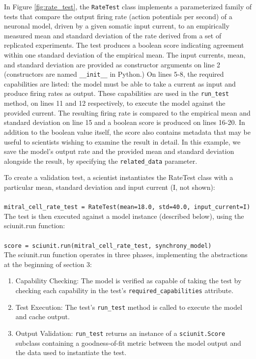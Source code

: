 \documentclass[11pt,letterpaper]{article}
\begin{document}
In Figure \ref{fig:rate_test}, the \verb|RateTest| class implements a parameterized family of tests that compare the output firing rate (action potentials per second) of a neuronal model, driven by a given somatic input current, to an empirically measured mean and standard deviation of the rate derived from a set of replicated experiments. The test produces a boolean score indicating agreement within one standard deviation of the empirical mean. The input currents, mean, and standard deviation are provided as constructor arguments on line 2 (constructors are named \verb|__init__| in Python.) On lines 5-8, the required capabilities are listed: the model must be able to take a current as input and produce firing rates as output. These capabilities are used in the \verb|run_test| method, on lines 11 and 12 respectively, to execute the model against the provided current. The resulting firing rate is compared to the empirical mean and standard deviation on line 15 and a boolean score is produced on lines 16-20. In addition to the boolean value itself, the score also contains metadata that may be useful to scientists wishing to examine the result in detail. In this example, we save the model's output rate and the provided mean and standard deviation alongside the result, by specifying the \verb|related_data| parameter.

To create a validation test, a scientist instantiates the RateTest class with a particular mean, standard deviation and input current (I, not shown):
\\
\\
\verb|mitral_cell_rate_test = RateTest(mean=18.0, std=40.0, input_current=I)|
\\

The test is then executed against a model instance (described below), using the sciunit.run function:
\\
\\
\verb|score = sciunit.run(mitral_cell_rate_test, synchrony_model)|
\\

The sciunit.run function operates in three phases, implementing the abstractions at the beginning of section 3:
\begin{enumerate}
\item Capability Checking: The model is verified as capable of taking the test by checking each capability in the test's \verb|required_capabilities| attribute.
\item Test Execution: The test's \verb|run_test| method is called to execute the model and cache output.
\item Output Validation: \verb|run_test| returns an instance of a \verb|sciunit.Score| subclass containing a goodness-of-fit metric between the model output and the data used to instantiate the test.
\end{enumerate}
\end{document}
